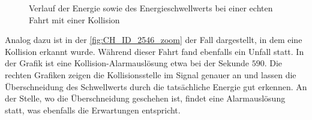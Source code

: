 \begin{figure}[htpb]
	\centering 
	\caption{Verlauf der Energie sowie des Energieschwellwerts bei einer echten Fahrt mit einer Kollision}
	\label{fig:CH_ID_2546_zoom}
\end{figure}
Analog dazu ist in der \autoref{fig:CH_ID_2546_zoom} der Fall dargestellt, in dem eine Kollision erkannt wurde. Während dieser Fahrt fand ebenfalls ein Unfall statt. 
In der Grafik ist eine Kollision-Alarmauslösung etwa bei der Sekunde $590$.
Die rechten Grafiken zeigen die Kollisionsstelle im Signal genauer an und lassen die Überschneidung des Schwellwerts durch die tatsächliche Energie gut erkennen.
An der Stelle, wo die Überschneidung geschehen ist, findet eine Alarmauslösung statt, was ebenfalls die Erwartungen entspricht.




